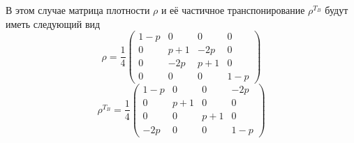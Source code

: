 В этом случае матрица плотности $\rho$ и её частичное транспонирование $\rho^{T_B}$ будут иметь следующий вид
\begin{equation}
    \rho = \frac{1}{4} 
    \begin{pmatrix}
        1-p & 0 &  0  & 0 \\
        0 & p+1 & -2p & 0 \\
        0 & -2p & p+1 & 0 \\
        0 & 0 & 0 & 1-p
    \end{pmatrix}
\end{equation}
\begin{equation}
    \rho^{T_B} = \frac{1}{4} 
    \begin{pmatrix}
        1-p & 0 &  0  & -2p \\
        0 & p+1 &  0 & 0 \\
        0 & 0 & p+1 & 0 \\
        -2p & 0 & 0 & 1-p
    \end{pmatrix}
\end{equation}

